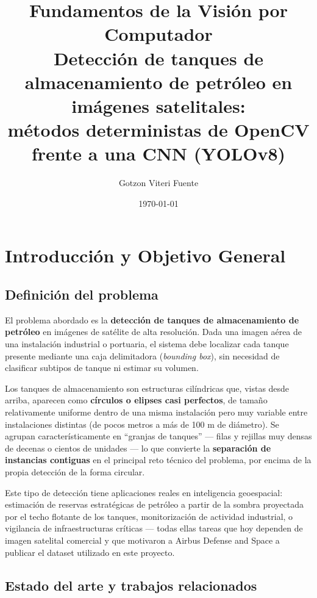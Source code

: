 \documentclass[11pt,a4paper]{article}
\title{
    \textbf{Fundamentos de la Visión por Computador} \\[0.5em]
    \large Detección de tanques de almacenamiento de petróleo en imágenes satelitales:\\
    métodos deterministas de OpenCV frente a una CNN (YOLOv8)
}
\author{Gotzon Viteri Fuente}
\date{\today}
\begin{document}
\maketitle
\thispagestyle{fancy}

\tableofcontents
\newpage

\section{Introducción y Objetivo General}

\subsection{Definición del problema}

El problema abordado es la \textbf{detección de tanques de almacenamiento de
petróleo} en imágenes de satélite de alta resolución. Dada una imagen aérea de una
instalación industrial o portuaria, el sistema debe localizar cada tanque presente
mediante una caja delimitadora (\emph{bounding box}), sin necesidad de clasificar
subtipos de tanque ni estimar su volumen.

Los tanques de almacenamiento son estructuras cilíndricas que, vistas desde arriba,
aparecen como \textbf{círculos o elipses casi perfectos}, de tamaño relativamente
uniforme dentro de una misma instalación pero muy variable entre instalaciones
distintas (de pocos metros a más de 100 m de diámetro). Se agrupan característicamente
en ``granjas de tanques'' --- filas y rejillas muy densas de decenas o cientos de
unidades --- lo que convierte la \textbf{separación de instancias contiguas} en el
principal reto técnico del problema, por encima de la propia detección de la forma
circular.

Este tipo de detección tiene aplicaciones reales en inteligencia geoespacial:
estimación de reservas estratégicas de petróleo a partir de la sombra proyectada por
el techo flotante de los tanques, monitorización de actividad industrial, o
vigilancia de infraestructuras críticas --- todas ellas tareas que hoy dependen de
imagen satelital comercial y que motivaron a Airbus Defense and Space a publicar el
dataset utilizado en este proyecto.

\subsection{Estado del arte y trabajos relacionados}
\end{document}
